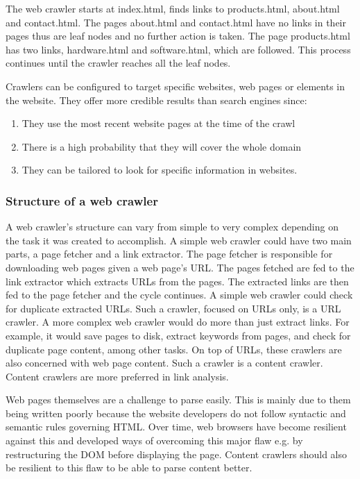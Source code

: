 \noindent
The web crawler starts at index.html, finds links to products.html, about.html and contact.html. The pages about.html and contact.html have no links in their pages thus are leaf nodes and no further action is taken. The page products.html has two links, hardware.html and software.html, which are followed. This process continues until the crawler reaches all the leaf nodes.

\noindent
Crawlers can be configured to target specific websites, web pages or elements in the website. They offer more credible results than search engines since:
\begin{enumerate}
\item They use the most recent website pages at the time of the crawl
\item There is a high probability that they will cover the whole domain
\item They can be tailored to look for specific information in websites.
\end{enumerate}

\subsubsection{Structure of a web crawler}

\noindent
A web crawler’s structure can vary from simple to very complex depending on the task it was created to accomplish. A simple web crawler could have two main parts, a page fetcher and a link extractor. The page fetcher is responsible for downloading web pages given a web page’s URL. The pages fetched are fed to the link extractor which extracts URLs from the pages. The extracted links are then fed to the page fetcher and the cycle continues. A simple web crawler could check for duplicate extracted URLs. Such a crawler, focused on URLs only, is a URL crawler. A more complex web crawler would do more than just extract links. For example, it would save pages to disk, extract keywords from pages, and check for duplicate page content, among other tasks. On top of URLs, these crawlers are also concerned with web page content. Such a crawler is a content crawler. Content crawlers are more preferred in link analysis.

\noindent
Web pages themselves are a challenge to parse easily. This is mainly due to them being written poorly because the website developers do not follow syntactic and semantic rules governing HTML. Over time, web browsers have become resilient against this and developed ways of overcoming this major flaw e.g. by restructuring the DOM before displaying the page. Content crawlers should also be resilient to this flaw to be able to parse content better.

